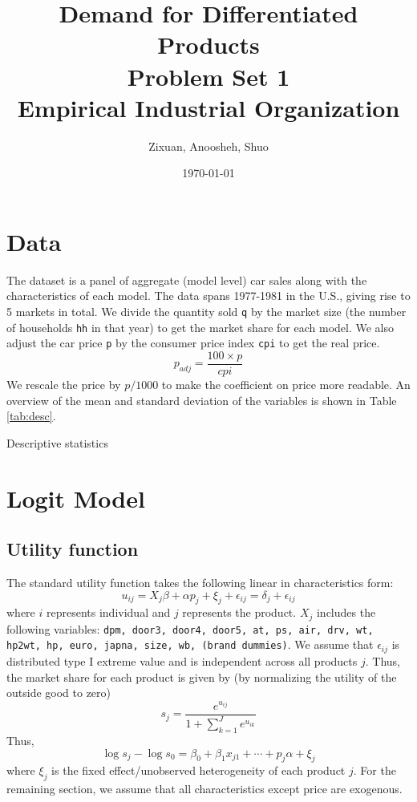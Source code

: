 \documentclass[12pt]{article}[margin=1in]
\title{\textbf{Demand for Differentiated Products} \\
\vspace{.3cm}
\large Problem Set 1 \\
Empirical Industrial Organization}
\author{Zixuan, Anoosheh, Shuo}
\date{\today}
\begin{document}
\maketitle

\setcounter{page}{1}

\section{Data}
The dataset is a panel of aggregate (model level) car sales along with the
characteristics of each model. The data spans 1977-1981 in the U.S., giving
rise to 5 markets in total. We divide the quantity sold \verb|q| by the market
size (the number of households \verb|hh| in that year) to get the market share
for each model. We also adjust the car price \verb|p| by the consumer price
index \verb|cpi| to get the real price.
\begin{equation*}
    p_{adj} = \frac{100 \times p}{cpi}
\end{equation*}
We rescale the price by $p/1000$ to make the coefficient on price more readable. An overview of the mean and standard deviation of the variables is shown in Table \ref{tab:desc}.

\begin{table}[h!]
    \fontsize{10pt}{12pt}\selectfont
    \centering
    
    \caption{Descriptive statistics}
    \label{tab:desc}
\end{table}

\section{Logit Model}
\subsection{Utility function}
The standard utility function takes the following linear in characteristics
form:
\begin{equation}
    u_{ij}=X_{j}\beta + \alpha p_{j} + \xi_{j}+ \epsilon_{ij}=\delta_j+\epsilon_{ij}
\end{equation}
where $i$ represents individual and $j$ represents the product. $X_{j}$ includes the following variables: \verb|dpm, door3, door4, door5, at, ps, air, drv, wt, hp2wt, hp, euro, japna, size, wb, (brand dummies)|. We assume that $\epsilon_{ij}$ is distributed type I extreme value and is independent across all products $j$. Thus, the market share for each product is given by (by normalizing the utility of the outside good to zero)
\begin{equation*}
    s_j = \frac{e^{u_{ij}}}{1 + \sum_{k=1}^{J} e^{u_{ik}}}
\end{equation*}
Thus,
\begin{equation}\label{eq:logit}
    \log s_j - \log s_0 = \beta_0 + \beta_1 x_{j1} + \cdots + p_j \alpha + \xi_j
\end{equation}
where $\xi_j$ is the fixed effect/unobserved heterogeneity of each product $j$. For the remaining section, we assume that all characteristics except price are exogenous.
\end{document}
